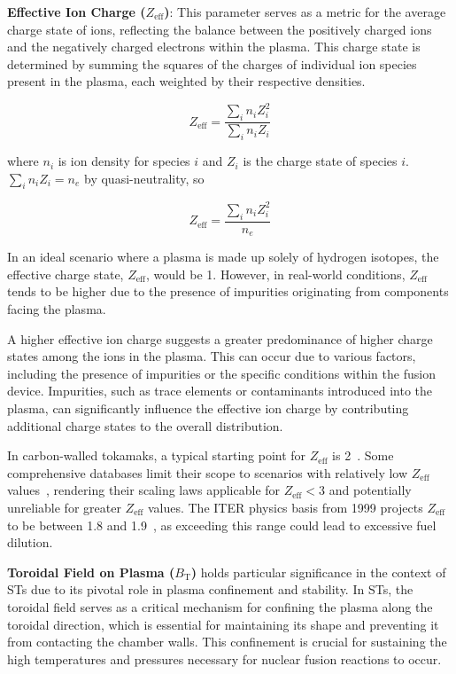 \documentclass[journal]{IEEEtran}
\begin{document}
\textbf{Effective Ion Charge ($Z_{\text{eff}}$)}: This parameter serves as a metric for the average charge state of ions, reflecting the balance between the positively charged ions and the negatively charged electrons within the plasma. This charge state is determined by summing the squares of the charges of individual ion species present in the plasma, each weighted by their respective densities.

\begin{equation}
    Z_{\text{eff}}=\frac {\sum _{i}n_{i}Z_{i}^{2}}{\sum _{i}n_{i}Z_{i}}
\end{equation}

where $n_{i}$ is ion density for species $i$ and $Z_{i}$ is the charge state of species $i$. $\sum _{i}n_{i}Z_{i}=n_{e}$ by quasi-neutrality, so

\begin{equation}
    Z_{\text{eff}}=\frac {\sum _{i}n_{i}Z_{i}^{2}}{n_{e}}
\end{equation}

In an ideal scenario where a plasma is made up solely of hydrogen isotopes, the effective charge state, $Z_{\text{eff}}$, would be 1. However, in real-world conditions, $Z_{\text{eff}}$ tends to be higher due to the presence of impurities originating from components facing the plasma.

A higher effective ion charge suggests a greater predominance of higher charge states among the ions in the plasma. This can occur due to various factors, including the presence of impurities or the specific conditions within the fusion device. Impurities, such as trace elements or contaminants introduced into the plasma, can significantly influence the effective ion charge by contributing additional charge states to the overall distribution.

In carbon-walled tokamaks, a typical starting point for $Z_{\text{eff}}$ is 2~\cite{Carlstrom1999, Eich2011}. Some comprehensive databases limit their scope to scenarios with relatively low $Z_{\text{eff}}$ values~\cite{Schissel1988}, rendering their scaling laws applicable for $Z_{\text{eff}}<3$ and potentially unreliable for greater $Z_{\text{eff}}$ values. The ITER physics basis from 1999 projects $Z_{\text{eff}}$ to be between 1.8 and 1.9~\cite{ITER19991, ITER19994}, as exceeding this range could lead to excessive fuel dilution.

\textbf{Toroidal Field on Plasma ($B_{\text{T}}$)} holds particular significance in the context of STs due to its pivotal role in plasma confinement and stability. In STs, the toroidal field serves as a critical mechanism for confining the plasma along the toroidal direction, which is essential for maintaining its shape and preventing it from contacting the chamber walls. This confinement is crucial for sustaining the high temperatures and pressures necessary for nuclear fusion reactions to occur.
\end{document}
